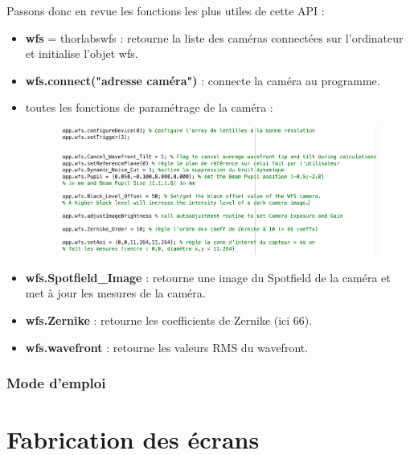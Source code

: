 Passons donc en revue les fonctions les plus utiles de cette API :
\begin{itemize}
    \item \textbf{wfs} = thorlabswfs : retourne la liste des caméras connectées sur l'ordinateur et initialise l'objet wfs.
    \item \textbf{wfs.connect("adresse caméra")} : connecte la caméra au programme.
    \item toutes les fonctions de paramétrage de la caméra :
          \begin{figure}[H]
              \includegraphics[width = \textwidth]{assets/figures/ameliorations/fonctions de paramètres caméra.png}
          \end{figure}
    \item \textbf{wfs.Spotfield\_Image} : retourne une image du Spotfield de la caméra et met à jour les mesures de la caméra.
    \item \textbf{wfs.Zernike} : retourne les coefficients de Zernike (ici 66).
    \item \textbf{wfs.wavefront} : retourne les valeurs RMS du wavefront.
\end{itemize}

\newpage
\subsubsection{Mode d'emploi}


\newpage
\section{Fabrication des écrans}

